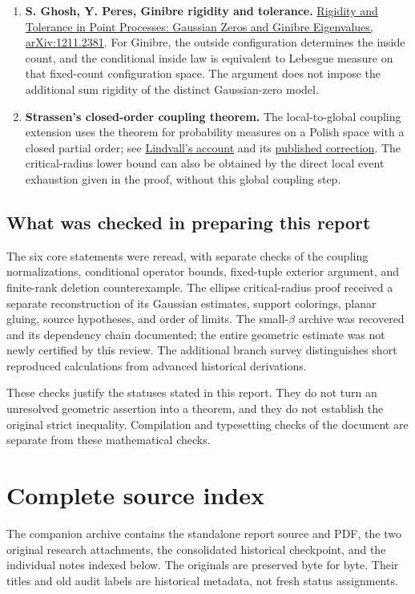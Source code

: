 \documentclass[11pt,a4paper]{article}
\theoremstyle{definition}
\theoremstyle{remark}
\numberwithin{equation}{section}
\begin{document}
\begin{enumerate}[leftmargin=*]
\item \textbf{S. Ghosh, Y. Peres, Ginibre rigidity and tolerance.}
\href{https://arxiv.org/abs/1211.2381}{Rigidity and Tolerance in Point
Processes: Gaussian Zeros and Ginibre Eigenvalues,
arXiv:1211.2381}.
For Ginibre, the outside configuration determines the inside count,
and the conditional inside law is equivalent to Lebesgue measure on
that fixed-count configuration space. The argument does not impose the
additional sum rigidity of the distinct Gaussian-zero model.

\item \textbf{Strassen's closed-order coupling theorem.}
The local-to-global coupling extension uses the theorem for probability
measures on a Polish space with a closed partial order; see
\href{https://www.maths.tcd.ie/EMIS/journals/EJP-ECP/article/download/1005/1005-3375-1-PB.pdf}{Lindvall's account}
and its
\href{https://www.maths.tcd.ie/EMIS/journals/EJP-ECP/article/downloadSuppFile/1005/1005-8956-1-SP.pdf}{published correction}.
The critical-radius lower bound can also be obtained by the direct local
event exhaustion given in the proof, without this global coupling step.
\end{enumerate}

\subsection{What was checked in preparing this report}
The six core statements were reread, with separate checks of the coupling
normalizations, conditional operator bounds, fixed-tuple exterior argument,
and finite-rank deletion counterexample. The ellipse critical-radius proof
received a separate reconstruction of its Gaussian estimates, support
colorings, planar gluing, source hypotheses, and order of limits. The
small-\(\beta\) archive was recovered and its dependency chain documented;
the entire geometric estimate was not newly certified by this review.
The additional branch survey distinguishes short reproduced calculations
from advanced historical derivations.

These checks justify the statuses stated in this report. They do not turn
an unresolved geometric assertion into a theorem, and they do not establish
the original strict inequality. Compilation and typesetting checks of the
document are separate from these mathematical checks.


\appendix
\section{Complete source index}
\label{app:source-index}
The companion archive contains the standalone report source and PDF, the two original research attachments, the consolidated historical checkpoint, and the individual notes indexed below. The originals are preserved byte for byte. Their titles and old audit labels are historical metadata, not fresh status assignments.
\end{document}
